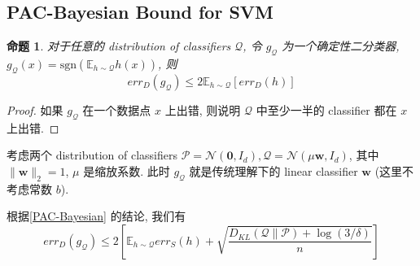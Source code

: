 \documentclass[8pt]{article}
\theoremstyle{compact}
\newtheorem{proposition}{命题}[section]
\def\le{\leqslant}
\begin{document}
\subsection{PAC-Bayesian Bound for SVM}
\begin{proposition}
	对于任意的 distribution of classifiers $\mathcal Q$, 令 $g_{\mathcal Q}$ 为一个确定性二分类器, $g_{\mathcal Q}(x) = \text{sgn}(\mathbb E_{h \sim \mathcal Q}h(x))$, 则 $$err_D(g_{\mathcal Q}) \le 2\mathbb E_{h \sim \mathcal Q}[err_D(h)]$$
\end{proposition}
\begin{proof}
	如果 $g_{\mathcal Q}$ 在一个数据点 $x$ 上出错, 则说明 $\mathcal Q$ 中至少一半的 classifier 都在 $x$ 上出错.
\end{proof}

考虑两个 distribution of classifiers $\mathcal P = \mathcal N(\mathbf 0, I_d), \mathcal Q = \mathcal N(\mu\mathbf w, I_d)$, 其中 $\|\mathbf w\|_2 = 1$, $\mu$ 是缩放系数. 此时 $g_{\mathcal Q}$ 就是传统理解下的 linear classifier $\mathbf w$ (这里不考虑常数 $b$).

根据\cref{PAC-Bayesian} 的结论, 我们有 $$err_D(g_{\mathcal Q}) \le 2 \left[\mathbb E_{h \sim \mathcal Q}err_S(h) + \sqrt{\frac{D_{KL}(\mathcal Q \| \mathcal P) + \log(3 / \delta)}{n}}\right]$$
\end{document}
